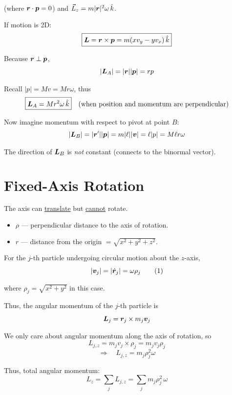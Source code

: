(where $\bm{r}\cdot\bm{p}=0$) and $\vec{L}_z = m|\bm{r}|^2\omega\,\hat{k}$.

If motion is 2D:
\[
    \boxed{\vect{L} = \lvect{r}\times\lvect{p} = m(xv_y - yv_x)\,\hat{k}}
\]

\begin{example}
Because $\bm{r}\perp\bm{p}$,
\[
    |\vect{L}_A| = |\lvect{r}||\lvect{p}| = rp
\]

Recall $|p| = Mv = Mr\omega$, thus
\[
    \boxed{\vect{L}_A = Mr^2\omega\,\hat{k}}
    \quad\text{(when position and momentum are perpendicular)}
\]

Now imagine momentum with respect to pivot at point $B$:
\[
    |\vect{L}_B| = |\lvect{r}'||\lvect{p}| = m|\ell||\lvect{v}| = \ell |p|
    = M\ell r\omega
\]

The direction of $\vect{L}_B$ is \emph{not} constant (connects to the binormal vector).
\end{example}

\section{Fixed-Axis Rotation}

\begin{definition}
The axis can \underline{translate} but \underline{cannot} rotate.
\end{definition}

\begin{itemize}
    \item $\rho$ — perpendicular distance to the axis of rotation.
    \item $r$ — distance from the origin $= \sqrt{x^2+y^2+z^2}$.
\end{itemize}

For the $j$-th particle undergoing circular motion about the $z$-axis,
\[
    |\bm{v}_j| = |\dot{\bm{r}}_j| = \omega\rho_j \tag{1}
\]

where $\rho_j = \sqrt{x^2+y^2}$ in this case.

Thus, the angular momentum of the $j$-th particle is
\[
    \vect{L}_j = \lvect{r}_j \times m_j \lvect{v}_j
\]

We only care about angular momentum along the axis of rotation, so
\[
    L_{j,z} = m_j v_j \times \rho_j = m_j v_j \rho_j
\]
\[
    \Rightarrow \quad L_{j,z} = m_j \rho_j^2 \omega
\]

Thus, total angular momentum:
\[
    L_z = \sum_j L_{j,z} = \sum_j m_j \rho_j^2\,\omega \tag{2}
\]

